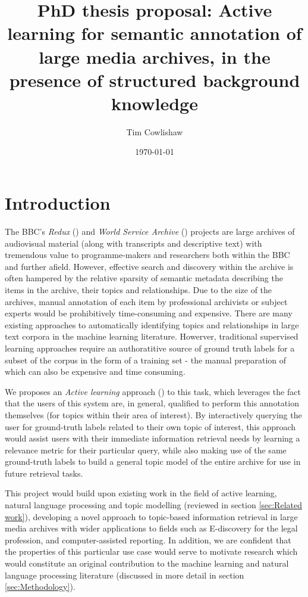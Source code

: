 \documentclass[a4paper, 11pt]{article}
\title{PhD thesis proposal: Active learning for semantic annotation of large media archives, in the presence of structured background knowledge}
\author{Tim Cowlishaw}
\date{\today}
\begin{document}
\maketitle
\section{Introduction}
The BBC's \textit{Redux} (\cite{Butterworth2008}) and \textit{World Service Archive} (\cite{Raimond}) projects are large archives of audiovisual material (along with transcripts and descriptive text) with tremendous value to programme-makers and researchers both within the BBC and further afield. However, effective search and discovery within the archive is often hampered by the relative sparsity of semantic metadata describing the items in the archive, their topics and relationships. Due to the size of the archives, manual annotation of each item by professional archivists or subject experts would be prohibitively time-consuming and expensive. There are many existing approaches to automatically identifying topics and relationships in large text corpora in the machine learning literature. Howerver, traditional supervised learning approaches require an authoratitive source of ground truth labels for a subset of the corpus in the form of a training set - the manual preparation of which can also be expensive and time consuming.

We proposes an \textit{Active learning} approach (\cite{Settles2012}) to this task, which leverages the fact that the users of this system are, in general, qualified to perform this annotation themselves (for topics within their area of interest). By    interactively querying the user for ground-truth labels related to their own topic of interest, this approach would assist users with their immediate information retrieval needs by learning a relevance metric for their particular query, while also making use of the same ground-truth labels to build a general topic model of the entire archive for use in future retrieval tasks.

This project would build upon existing work in the field of active learning, natural language processing and topic modelling (reviewed in section \ref{sec:Related work}), developing a novel approach to topic-based information retrieval in large media archives with wider applications to fields such as E-discovery for the legal profession, and computer-assisted reporting. In addition, we are confident that the properties of this particular use case would serve to motivate research which would constitute an original contribution to the machine learning and natural language processing literature (discussed in more detail in section \ref{sec:Methodology}).
\end{document}
